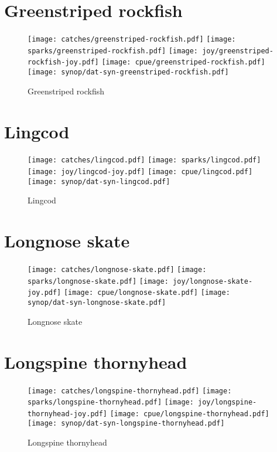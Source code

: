 \section*{Greenstriped rockfish}

\begin{figure}[htbp]
\centering
\texttt{[image: catches/greenstriped-rockfish.pdf]}
\texttt{[image: sparks/greenstriped-rockfish.pdf]}
\texttt{[image: joy/greenstriped-rockfish-joy.pdf]}
\texttt{[image: cpue/greenstriped-rockfish.pdf]}
\texttt{[image: synop/dat-syn-greenstriped-rockfish.pdf]}
\caption{Greenstriped rockfish}
\end{figure}
\clearpage
\section*{Lingcod}

\begin{figure}[htbp]
\centering
\texttt{[image: catches/lingcod.pdf]}
\texttt{[image: sparks/lingcod.pdf]}
\texttt{[image: joy/lingcod-joy.pdf]}
\texttt{[image: cpue/lingcod.pdf]}
\texttt{[image: synop/dat-syn-lingcod.pdf]}
\caption{Lingcod}
\end{figure}
\clearpage
\section*{Longnose skate}

\begin{figure}[htbp]
\centering
\texttt{[image: catches/longnose-skate.pdf]}
\texttt{[image: sparks/longnose-skate.pdf]}
\texttt{[image: joy/longnose-skate-joy.pdf]}
\texttt{[image: cpue/longnose-skate.pdf]}
\texttt{[image: synop/dat-syn-longnose-skate.pdf]}
\caption{Longnose skate}
\end{figure}
\clearpage
\section*{Longspine thornyhead}

\begin{figure}[htbp]
\centering
\texttt{[image: catches/longspine-thornyhead.pdf]}
\texttt{[image: sparks/longspine-thornyhead.pdf]}
\texttt{[image: joy/longspine-thornyhead-joy.pdf]}
\texttt{[image: cpue/longspine-thornyhead.pdf]}
\texttt{[image: synop/dat-syn-longspine-thornyhead.pdf]}
\caption{Longspine thornyhead}
\end{figure}
\clearpage
